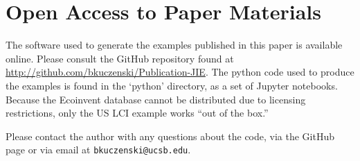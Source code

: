\section{Open Access to Paper Materials}
The software used to generate the examples published in this paper is available online.  Please consult the GitHub repository found at \url{http://github.com/bkuczenski/Publication-JIE}.  The python code used to produce the examples is found in the `python' directory, as a set of Jupyter notebooks.  Because the Ecoinvent database cannot be distributed due to licensing restrictions, only the US LCI example works ``out of the box.''

Please contact the author with any questions about the code, via the GitHub page or via email at \texttt{bkuczenski@ucsb.edu}.
